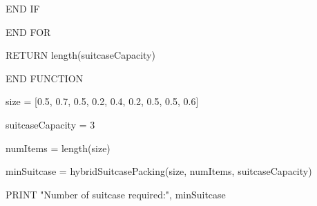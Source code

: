 \documentclass[12pt]{article}
\begin{document}
\vspace{0.1cm}

 \hspace{0.5cm}       END IF
 
\vspace{0.1cm} 

\hspace{0.1cm}    END FOR

\vspace{0.5cm}

\hspace{0.1cm}    RETURN length(suitcaseCapacity)
    
\vspace{0.1cm}

END FUNCTION

\vspace{0.1cm}

size = [0.5, 0.7, 0.5, 0.2, 0.4, 0.2, 0.5, 0.5, 0.6]

\vspace{0.1cm}

suitcaseCapacity = 3
\vspace{0.1cm}

numItems = length(size)

\vspace{0.3cm}
minSuitcase = hybridSuitcasePacking(size, numItems, suitcaseCapacity)
\vspace{0.3cm}

PRINT "Number of suitcase required:", minSuitcase
\end{document}
